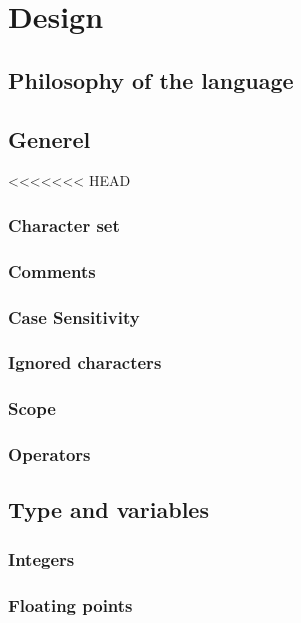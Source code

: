 \chapter{Design}
\label{cha:Design}
\section{Philosophy of the language}


\section{Generel}
<<<<<<< HEAD
\subsection{Character set}

\subsection{Comments}

\subsection{Case Sensitivity}

\subsection{Ignored characters}

\subsection{Scope}

\subsection{Operators}

\section{Type and variables}
\subsection{Integers}

\subsection{Floating points}

